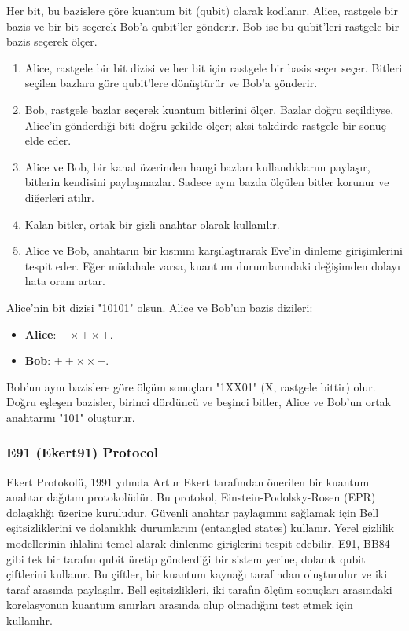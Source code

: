 Her bit, bu bazislere göre kuantum bit (qubit) olarak kodlanır. Alice, rastgele bir bazis ve bir bit seçerek Bob'a qubit'ler gönderir. Bob ise bu qubit'leri rastgele bir bazis seçerek ölçer.

\begin{enumerate}
    \item Alice, rastgele bir bit dizisi ve her bit için rastgele bir basis seçer seçer. Bitleri seçilen bazlara göre qubit'lere dönüştürür ve Bob'a gönderir.
    \item Bob, rastgele bazlar seçerek kuantum bitlerini ölçer. Bazlar doğru seçildiyse, Alice'in gönderdiği biti doğru şekilde ölçer; aksi takdirde rastgele bir sonuç elde eder.
    \item Alice ve Bob, bir kanal üzerinden hangi bazları kullandıklarını paylaşır, bitlerin kendisini paylaşmazlar. Sadece aynı bazda ölçülen bitler korunur ve diğerleri atılır.
    \item Kalan bitler, ortak bir gizli anahtar olarak kullanılır.
    \item Alice ve Bob, anahtarın bir kısmını karşılaştırarak Eve'in dinleme girişimlerini tespit eder. Eğer müdahale varsa, kuantum durumlarındaki değişimden dolayı hata oranı artar.
\end{enumerate}

Alice'nin bit dizisi "10101" olsun. Alice ve Bob'un bazis dizileri:

\begin{itemize}
    \item \textbf{Alice}: $+ \times + \times +$.
    \item \textbf{Bob}: $+ + \times \times +$.
\end{itemize}

Bob'un aynı bazislere göre ölçüm sonuçları "1XX01" (X, rastgele bittir) olur. Doğru eşleşen bazisler, birinci dördüncü ve beşinci bitler, Alice ve Bob'un ortak anahtarını "101" oluşturur.

\newpage

\subsubsection{E91 (Ekert91) Protocol}

Ekert Protokolü, 1991 yılında Artur Ekert tarafından önerilen bir kuantum anahtar dağıtım protokolüdür. Bu protokol, Einstein-Podolsky-Rosen (EPR) dolaşıklığı üzerine kuruludur. Güvenli anahtar paylaşımını sağlamak için Bell eşitsizliklerini ve dolanıklık durumlarını (entangled states) kullanır. Yerel gizlilik modellerinin ihlalini temel alarak dinlenme girişlerini tespit edebilir. E91, BB84 gibi tek bir tarafın qubit üretip gönderdiği bir sistem yerine, dolanık qubit çiftlerini kullanır. Bu çiftler, bir kuantum kaynağı tarafından oluşturulur ve iki taraf arasında paylaşılır. Bell eşitsizlikleri, iki tarafın ölçüm sonuçları arasındaki korelasyonun kuantum sınırları arasında olup olmadığını test etmek için kullanılır. 

